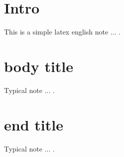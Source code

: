 

\section{
Intro
}
This is a simple latex english note ... .


\section{
body title
}


Typical note ... .



\section{
end title
}


Typical note ... .